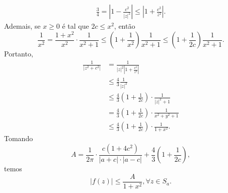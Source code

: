 \begin{exemplo}
            \begin{align*}
                \frac{3}{4} = \left|1 - \frac{c^2}{|z|^2}\right| \leq \left|1 + \frac{c^2}{z^2}\right|.
            \end{align*}
            Ademais, se $x\geq 0$ é tal que $2c \leq x^2$, então
            \begin{equation*}
                \frac{1}{x^2} = \frac{1+x^2}{x^2}\cdot\frac{1}{x^2+1}
                              \leq \left( 1+\frac{1}{x^2} \right)\frac{1}{x^2+1}
                              \leq \left( 1+\frac{1}{2c} \right)\frac{1}{x^2+1}.
            \end{equation*} 
            Portanto,
            \begin{align*}
                \frac{1}{|z^2+c^2|} &= \frac{1}{|z|^2\left|1+\frac{c^2}{z^2}\right|} \\
                                    &\leq \frac{4}{3}\frac{1}{|z|^2} \\
                                    &\leq \frac{4}{3}\left(1+\frac{1}{2c}\right)\cdot\frac{1}{|z|^2+1} \\
                                    &= \frac{4}{3}\left(1+\frac{1}{2c}\right)\cdot\frac{1}{x^2+y^2+1} \\
                                    &\leq \frac{4}{3}\left(1+\frac{1}{2c}\right)\cdot\frac{1}{1+x^2}.
            \end{align*}
            Tomando
            \begin{equation*}
                A =\frac{1}{2\pi}\cdot\frac{c(1+4c^2)}{|a+c|\cdot|a-c|}
                +\frac{4}{3}\left(1+\frac{1}{2c}\right),
            \end{equation*}
            temos
            \begin{equation*}
                |f(z)| \leq \frac{A}{1+ x^2}, \forall z\in S_a.
            \end{equation*}
        \end{exemplo}
